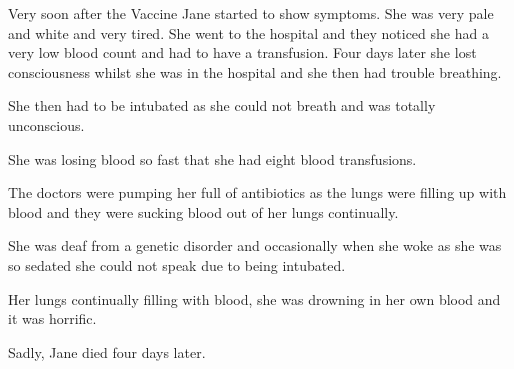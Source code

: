 Very soon after the Vaccine Jane started to show symptoms. She was very pale and
white and very tired. She went to the hospital and they noticed she had a very
low blood count and had to have a transfusion. Four days later she lost
consciousness whilst she was in the hospital and she then had trouble breathing.

She then had to be intubated as she could not breath and was totally unconscious.

She was losing blood so fast that she had eight blood transfusions.

The doctors were pumping her full of antibiotics as the lungs were filling up
with blood and they were sucking blood out of her lungs continually.

She was deaf from a genetic disorder and occasionally when she woke as she was
so sedated she could not speak due to being intubated.

Her lungs continually filling with blood, she was drowning in her own blood and
it was horrific.

Sadly, Jane died four days later.


